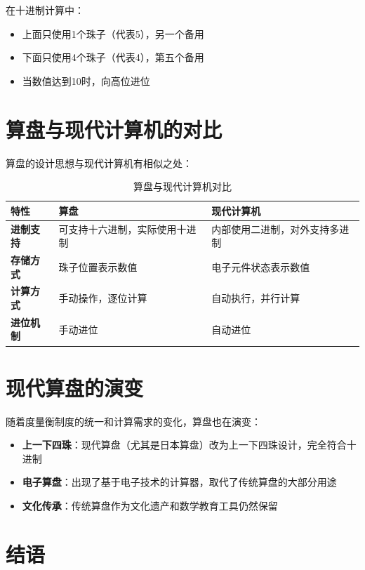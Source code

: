 \documentclass[12pt,UTF8]{ctexbook}
\begin{document}
在十进制计算中：
\begin{itemize}[leftmargin=2cm]
    \item 上面只使用1个珠子（代表5），另一个备用
    \item 下面只使用4个珠子（代表4），第五个备用
    \item 当数值达到10时，向高位进位
\end{itemize}

\section{算盘与现代计算机的对比}

算盘的设计思想与现代计算机有相似之处：

\begin{table}[htbp]
    \centering
    \caption{算盘与现代计算机对比}
    \begin{tabular}{|p{3cm}|p{3.5cm}|p{3.5cm}|}
        \hline
        \textbf{特性} & \textbf{算盘} & \textbf{现代计算机} \\
        \hline
        \textbf{进制支持} & 可支持十六进制，实际使用十进制 & 内部使用二进制，对外支持多进制 \\
        \hline
        \textbf{存储方式} & 珠子位置表示数值 & 电子元件状态表示数值 \\
        \hline
        \textbf{计算方式} & 手动操作，逐位计算 & 自动执行，并行计算 \\
        \hline
        \textbf{进位机制} & 手动进位 & 自动进位 \\
        \hline
    \end{tabular}
\end{table}

\section{现代算盘的演变}

随着度量衡制度的统一和计算需求的变化，算盘也在演变：

\begin{itemize}[leftmargin=2cm]
    \item \textbf{上一下四珠}：现代算盘（尤其是日本算盘）改为上一下四珠设计，完全符合十进制
    \item \textbf{电子算盘}：出现了基于电子技术的计算器，取代了传统算盘的大部分用途
    \item \textbf{文化传承}：传统算盘作为文化遗产和数学教育工具仍然保留
\end{itemize}

\section{结语}
\end{document}
